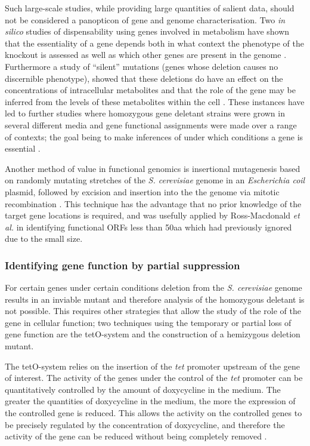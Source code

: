 Such large-scale studies, while providing large quantities of salient data, should not be considered a panopticon of gene and genome characterisation. Two \emph{in silico} studies of dispensability using genes involved in metabolism have shown that the essentiality of a gene depends both in what context the phenotype of the knockout is assessed as well as which other genes are present in the genome \cite{Pal2006,Papp2004}. Furthermore a study of ``silent'' mutations (genes whose deletion causes no discernible phenotype), showed that these deletions do have an effect on the concentrations of intracellular metabolites and that the role of the gene may be inferred from the levels of these metabolites within the cell \cite{Raamsdonk2001}. These instances have led to further studies where homozygous gene deletant strains were grown in several different media and gene functional assignments were made over a range of contexts; the goal being to make inferences of under which conditions a gene is essential \cite{Dudley2005,Giaever2002}.

Another method of value in functional genomics is insertional mutagenesis based on randomly mutating stretches of the \emph{S. cerevisiae} genome in an \emph{Escherichia coil} plasmid, followed by excision and insertion into the the genome via mitotic recombination \cite{Vidan2001}. This technique has the advantage that no prior knowledge of the target gene locations is required, and was usefully applied by Ross-Macdonald \emph{et al.} \cite{Ross-Macdonald1999} in identifying functional ORFs less than 50aa which had previously ignored due to the small size.

\subsubsection{Identifying gene function by partial suppression}

For certain genes under certain conditions deletion from the \emph{S. cerevisiae} genome results in an inviable mutant and therefore analysis of the homozygous deletant is not possible. This requires other strategies that allow the study of the role of the gene in cellular function; two techniques using the temporary or partial loss of gene function are the tetO-system and the construction of a hemizygous deletion mutant.

The tetO-system relies on the insertion of the \emph{tet} promoter upstream of the gene of interest. The activity of the genes under the control of the \emph{tet} promoter can be quantitatively controlled by the amount of doxycycline in the medium. The greater the quantities of doxycycline in the medium, the more the expression of the controlled gene is reduced. This allows the activity on the controlled genes to be precisely regulated by the concentration of doxycycline, and therefore the activity of the gene can be reduced without being completely removed \cite{Mnaimneh2004}.

